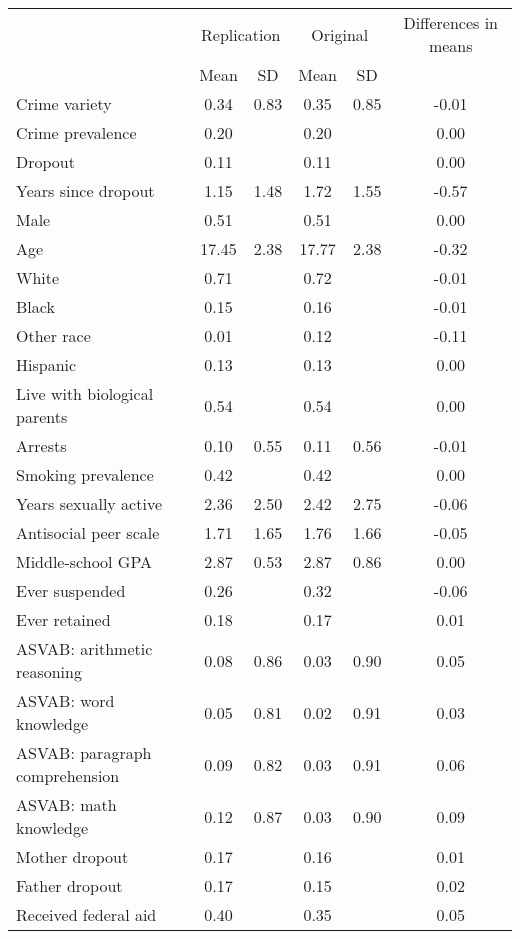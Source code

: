\begin{center}
\begin{tabular}{lccccc}
\hline \noalign{\smallskip} & \multicolumn{2}{c}{Replication} & \multicolumn{2}{c}{Original} & Differences in means\\
 & Mean & SD & Mean & SD & \\
\noalign{\smallskip}\hline \noalign{\smallskip}Crime variety & 0.34 & 0.83 & 0.35 & 0.85 & -0.01\\
Crime prevalence & 0.20 &  & 0.20 &  & 0.00\\
Dropout & 0.11 &  & 0.11 &  & 0.00\\
Years since dropout & 1.15 & 1.48 & 1.72 & 1.55 & -0.57\\
Male & 0.51 &  & 0.51 &  & 0.00\\
Age & 17.45 & 2.38 & 17.77 & 2.38 & -0.32\\
White & 0.71 &  & 0.72 &  & -0.01\\
Black & 0.15 &  & 0.16 &  & -0.01\\
Other race & 0.01 &  & 0.12 &  & -0.11\\
Hispanic & 0.13 &  & 0.13 &  & 0.00\\
Live with biological parents & 0.54 &  & 0.54 &  & 0.00\\
Arrests & 0.10 & 0.55 & 0.11 & 0.56 & -0.01\\
Smoking prevalence & 0.42 &  & 0.42 &  & 0.00\\
Years sexually active & 2.36 & 2.50 & 2.42 & 2.75 & -0.06\\
Antisocial peer scale & 1.71 & 1.65 & 1.76 & 1.66 & -0.05\\
Middle-school GPA & 2.87 & 0.53 & 2.87 & 0.86 & 0.00\\
Ever suspended & 0.26 &  & 0.32 &  & -0.06\\
Ever retained & 0.18 &  & 0.17 &  & 0.01\\
ASVAB: arithmetic reasoning & 0.08 & 0.86 & 0.03 & 0.90 & 0.05\\
ASVAB: word knowledge & 0.05 & 0.81 & 0.02 & 0.91 & 0.03\\
ASVAB: paragraph comprehension & 0.09 & 0.82 & 0.03 & 0.91 & 0.06\\
ASVAB: math knowledge & 0.12 & 0.87 & 0.03 & 0.90 & 0.09\\
Mother dropout & 0.17 &  & 0.16 &  & 0.01\\
Father dropout & 0.17 &  & 0.15 &  & 0.02\\
Received federal aid & 0.40 &  & 0.35 &  & 0.05\\

\end{tabular}
\end{center}
